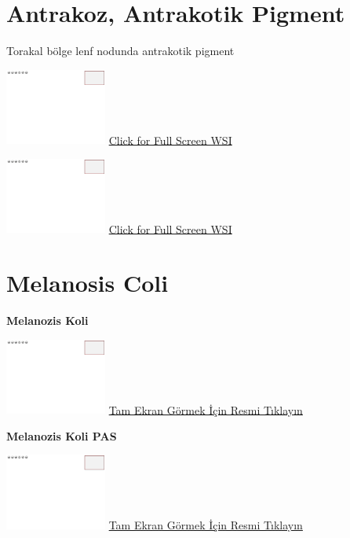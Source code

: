 \documentclass[
  letterpaper,
  DIV=11,
  numbers=noendperiod]{scrreprt}
\begin{document}
\hypertarget{sec-antrakoz-antrakotik-pigment}{%
\section{Antrakoz, Antrakotik
Pigment}\label{sec-antrakoz-antrakotik-pigment}}

Torakal bölge lenf nodunda antrakotik pigment

\href{https://images.patolojiatlasi.com/template/HE.html}{\includegraphics[width=0.25\textwidth,height=\textheight]{./screenshots/template_screenshot.png}}
\href{https://images.patolojiatlasi.com/anthracosis/HE.html}{Click for
Full Screen WSI}

\href{https://images.patolojiatlasi.com/template/HE.html}{\includegraphics[width=0.25\textwidth,height=\textheight]{./screenshots/template_screenshot.png}}
\href{https://images.patolojiatlasi.com/anthracosis/HE2.html}{Click for
Full Screen WSI}

\hypertarget{sec-melanosis-coli}{%
\section{Melanosis Coli}\label{sec-melanosis-coli}}

\textbf{Melanozis Koli}

\href{https://images.patolojiatlasi.com/template/HE.html}{\includegraphics[width=0.25\textwidth,height=\textheight]{./screenshots/template_screenshot.png}}
\href{https://images.patolojiatlasi.com/melanosiscoli/HE.html}{Tam Ekran
Görmek İçin Resmi Tıklayın}

\textbf{Melanozis Koli PAS}

\href{https://images.patolojiatlasi.com/template/HE.html}{\includegraphics[width=0.25\textwidth,height=\textheight]{./screenshots/template_screenshot.png}}
\href{https://images.patolojiatlasi.com/melanosiscoli/PAS.html}{Tam
Ekran Görmek İçin Resmi Tıklayın}
\end{document}
